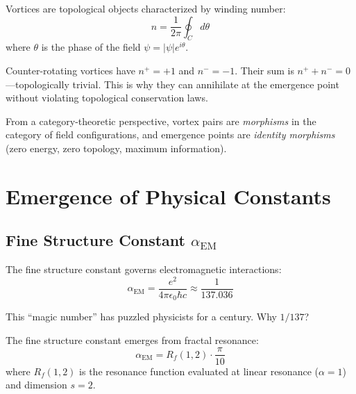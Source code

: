 \begin{level3}
Vortices are topological objects characterized by winding number:
\begin{equation}
n = \frac{1}{2\pi} \oint_C d\theta
\end{equation}
where $\theta$ is the phase of the field $\psi = |\psi|e^{i\theta}$.

Counter-rotating vortices have $n^+ = +1$ and $n^- = -1$. Their sum is $n^+ + n^- = 0$---topologically trivial. This is why they can annihilate at the emergence point without violating topological conservation laws.

From a category-theoretic perspective, vortex pairs are \textit{morphisms} in the category of field configurations, and emergence points are \textit{identity morphisms} (zero energy, zero topology, maximum information).
\end{level3}

\section{Emergence of Physical Constants}

\subsection{Fine Structure Constant $\alpha_{\text{EM}}$}

The fine structure constant governs electromagnetic interactions:
\begin{equation}
\alpha_{\text{EM}} = \frac{e^2}{4\pi\epsilon_0\hbar c} \approx \frac{1}{137.036}
\end{equation}

This ``magic number'' has puzzled physicists for a century. Why $1/137$? 

\begin{thm}\label{thm:fine-structure}
The fine structure constant emerges from fractal resonance:
\begin{equation}
\alpha_{\text{EM}} = R_f(1, 2) \cdot \frac{\pi}{10}
\end{equation}
where $R_f(1,2)$ is the resonance function evaluated at linear resonance ($\alpha=1$) and dimension $s=2$.
\end{thm}

